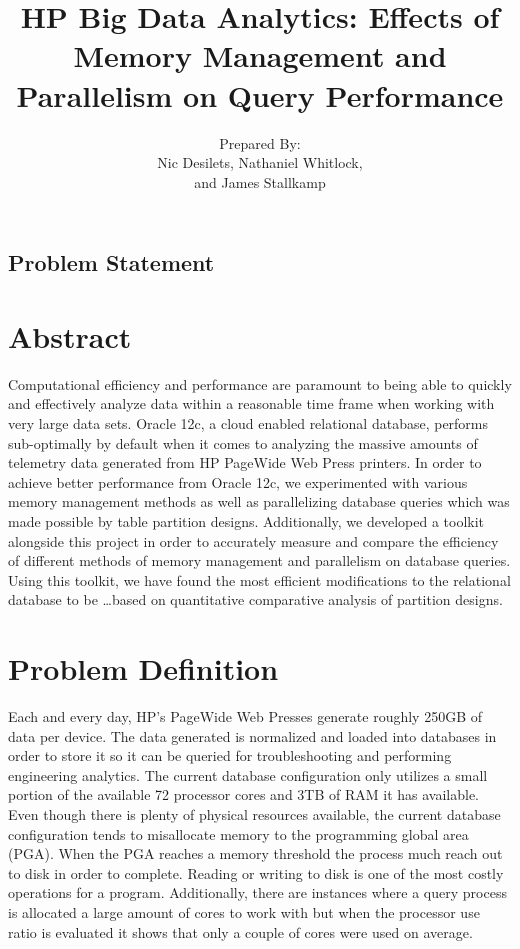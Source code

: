 \documentclass[letterpaper, 10pt, titlepage]{article}
\author{Prepared By:\\Nic Desilets, Nathaniel Whitlock,\\ and James Stallkamp}
\title{\huge HP Big Data Analytics: Effects of Memory Management and Parallelism on Query Performance}
\begin{document}
\maketitle
\begin{center}
	\section*{\huge Problem Statement}
\end{center}

\section*{Abstract}
Computational efficiency and performance are paramount to being able to quickly and effectively analyze data within a reasonable time frame when working with very large data sets. Oracle 12c, a cloud enabled relational database, performs sub-optimally by default when it comes to analyzing the massive amounts of telemetry data generated from HP PageWide Web Press printers. In order to achieve better performance from Oracle 12c, we experimented with various memory management methods as well as parallelizing database queries which was made possible by table partition designs. Additionally, we developed a toolkit alongside this project in order to accurately measure and compare the efficiency of different methods of memory management and parallelism on database queries. Using this toolkit, we have found the most efficient modifications to the relational database to be \ldots based on quantitative comparative analysis of partition designs.

\section*{Problem Definition}
Each and every day, HP’s PageWide Web Presses generate roughly 250GB of data per device. The data generated is normalized and loaded into databases in order to store it so it can be queried for troubleshooting and performing engineering analytics. The current database configuration only utilizes a small portion of the available 72 processor cores and 3TB of RAM it has available. Even though there is plenty of physical resources available, the current database configuration tends to misallocate memory to the programming global area (PGA). When the PGA reaches a memory threshold the process much reach out to disk in order to complete. Reading or writing to disk is one of the most costly operations for a program. Additionally, there are instances where a query process is allocated a large amount of cores to work with but when the processor use ratio is evaluated it shows that only a couple of cores were used on average.
\end{document}
